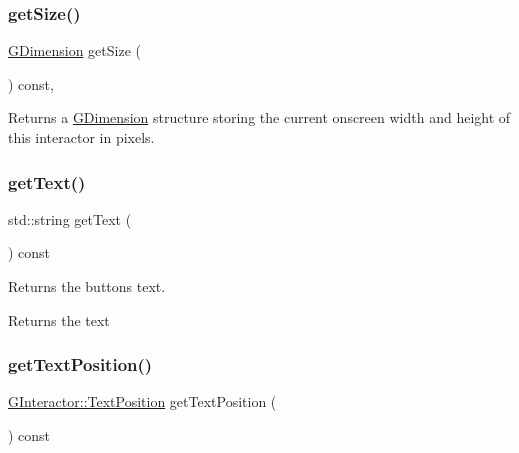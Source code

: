 \subsubsection{\texorpdfstring{get\+Size()}{getSize()}}
{\footnotesize\ttfamily \mbox{\hyperlink{structsgl_1_1GDimension}{G\+Dimension}} get\+Size (\begin{DoxyParamCaption}{ }\end{DoxyParamCaption}) const\hspace{0.3cm}{\ttfamily [virtual]}, {\ttfamily [inherited]}}



Returns a \mbox{\hyperlink{structsgl_1_1GDimension}{G\+Dimension}} structure storing the current onscreen width and height of this interactor in pixels. 

\mbox{\label{classsgl_1_1GButton_aff553c50924b836c29f146ed34a7c6ec}} 
\subsubsection{\texorpdfstring{get\+Text()}{getText()}}
{\footnotesize\ttfamily std\+::string get\+Text (\begin{DoxyParamCaption}{ }\end{DoxyParamCaption}) const\hspace{0.3cm}{\ttfamily [virtual]}}



Returns the button\textquotesingle{}s text. 

\begin{DoxyReturn}{Returns}
the text 
\end{DoxyReturn}
\mbox{\label{classsgl_1_1GButton_a3fc623df3ced62aca93fc344c2426899}} 
\subsubsection{\texorpdfstring{get\+Text\+Position()}{getTextPosition()}}
{\footnotesize\ttfamily \mbox{\hyperlink{classsgl_1_1GInteractor_a8e0d441725a81d2bbdebbea09078260e}{G\+Interactor\+::\+Text\+Position}} get\+Text\+Position (\begin{DoxyParamCaption}{ }\end{DoxyParamCaption}) const\hspace{0.3cm}{\ttfamily [virtual]}}




